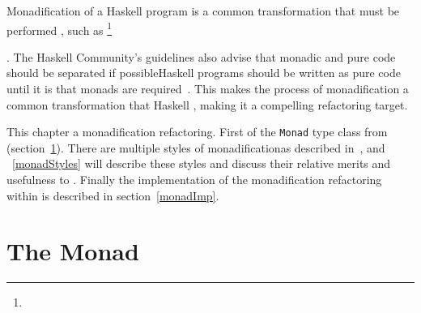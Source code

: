 Monadification of a Haskell program is a common transformation that must be performed \DIFdelbegin {}\DIFdelend \DIFaddbegin {}\DIFaddend , such as \DIFdelbegin {}\footnote{}%
\addtocounter{footnote}{-1}%
\DIFdelend \DIFaddbegin {}\texttt{} \DIFaddend . The Haskell Community's guidelines also advise that monadic and pure code should be separated if possible\DIFdelbegin {}\DIFdelend \DIFaddbegin {}\DIFaddend Haskell programs should be written as pure code until it is \DIFdelbegin {}\DIFdelend \DIFaddbegin {}\DIFaddend that monads are required~\citep{guidelines}. This makes the process of monadification a common transformation that Haskell \DIFdelbegin {}\DIFdelend \DIFaddbegin {}\DIFaddend , making it a compelling refactoring target.

This chapter \DIFdelbegin {}\DIFdelend \DIFaddbegin {}\DIFaddend a monadification refactoring. First \DIFdelbegin {}\DIFdelend \DIFaddbegin {}\DIFaddend of the \texttt{Monad} type class from \DIFdelbegin {}\DIFdelend \DIFaddbegin {}\DIFaddend (section~\ref{monTC}). There are multiple styles of monadification\DIFaddbegin \DIFadd{, }\DIFaddend as described in~\citep{monadSurvey}, and \DIFdelbegin {}\DIFdelend \DIFaddbegin {}\DIFaddend ~\ref{monadStyles} will describe these styles and discuss their relative merits and usefulness to \DIFdelbegin {}\DIFdelend \DIFaddbegin {}\DIFaddend . Finally the implementation of the monadification refactoring within \DIFdelbegin {}\DIFdelend \DIFaddbegin {}\DIFaddend is described in section~\ref{monadImp}.

\section{The Monad \DIFdelbegin {}\DIFdelend \DIFaddbegin {}\DIFaddend }
\label{monTC}

